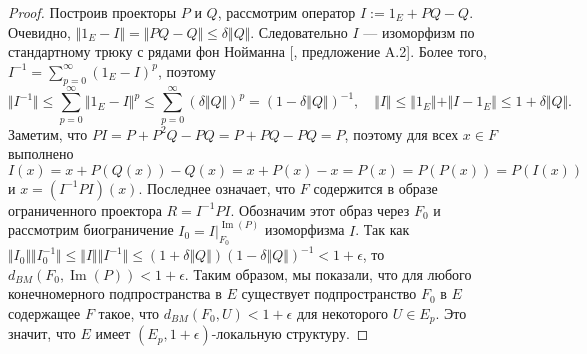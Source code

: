 \begin{proof}
Построив проекторы $P$ и $Q$, рассмотрим оператор $I:=1_E+PQ-Q$. Очевидно, $\Vert 1_E-I\Vert=\Vert PQ-Q\Vert\leq \delta\Vert Q\Vert$. Следовательно $I$ --- изоморфизм по стандартному трюку с рядами фон Нойманна [\cite{KalAlbTopicsBanSpTh}, предложение A.2]. Более того, $I^{-1}=\sum_{p=0}^\infty(1_E-I)^p$, поэтому
$$
\Vert I^{-1}\Vert\leq\sum_{p=0}^\infty\Vert 1_E-I\Vert^p\leq\sum_{p=0}^\infty(\delta\Vert Q\Vert)^p=(1-\delta\Vert Q\Vert)^{-1},
\quad
\Vert I\Vert\leq\Vert 1_E\Vert+\Vert I-1_E\Vert\leq 1+\delta\Vert Q\Vert.
$$
Заметим, что $PI=P+P^2Q-PQ=P+PQ-PQ=P$, поэтому для всех $x\in F$ выполнено 
$$
I(x)=x+P(Q(x))-Q(x)=x+P(x)-x=P(x)=P(P(x))=P(I(x))
$$
и $x=(I^{-1}PI)(x)$. Последнее означает, что $F$ содержится в образе ограниченного проектора $R=I^{-1}PI$. Обозначим этот образ через $F_0$ и рассмотрим биограничение  $I_0=I|_{F_0}^{\operatorname{Im}(P)}$ изоморфизма $I$. Так как $\Vert I_0\Vert\Vert I_0^{-1}\Vert\leq\Vert I\Vert\Vert I^{-1}\Vert\leq(1+\delta\Vert Q\Vert)(1-\delta\Vert Q\Vert)^{-1}<1+\epsilon$, то $d_{BM}(F_0,\operatorname{Im}(P))<1+\epsilon$. Таким образом, мы показали, что для любого конечномерного подпространства в $E$ существует подпространство $F_0$ в $E$ содержащее $F$ такое, что $d_{BM}(F_0,U)<1+\epsilon$ для некоторого $U\in E_{p}$. Это значит, что $E$ имеет $(E_{p}, 1+\epsilon)$-локальную структуру.
\end{proof}

